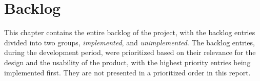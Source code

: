 \chapter{Backlog}
\label{chap:backlog}

This chapter contains the entire backlog of the project, with the backlog entries divided into two groups, \emph{implemented}, and \emph{unimplemented}. 
The backlog entries, during the development period, were prioritized based on their relevance for the design and the usability of the product, with the highest priority entries being implemented first.
They are not presented in a prioritized order in this report.




